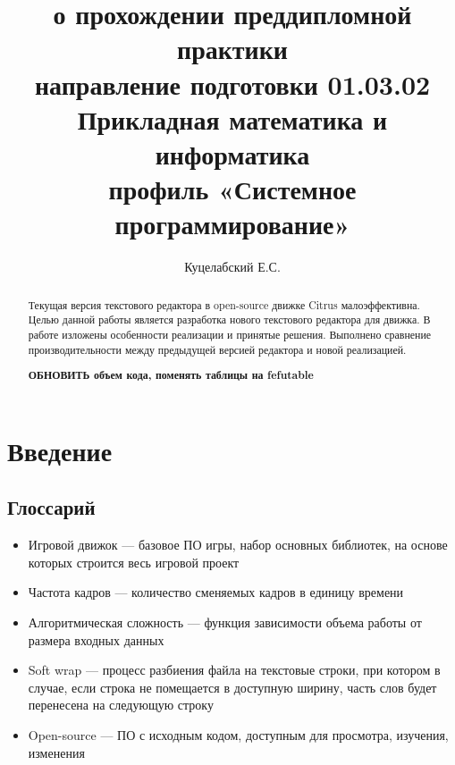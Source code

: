 \documentclass{fefu}
\begin{document}
	\title{о прохождении преддипломной практики\\направление подготовки 01.03.02 
	Прикладная математика и информатика\\профиль «Системное программирование»}
	\author{Куцелабский Е.С.}
	
	\makereporttitle
	\tableofcontents
	\newpage
	
	\begin{abstract}
		\par Текущая версия текстового редактора в open-source движке Citrus малоэффективна.
		Целью данной работы является разработка нового текстового редактора для 
		движка. В работе изложены особенности реализации и принятые решения.
		Выполнено сравнение производительности между предыдущей версией редактора и
		новой реализацией.
		\par \textbf{ОБНОВИТЬ объем кода, поменять таблицы на fefutable}
	\end{abstract}

	\section{Введение}
		\subsection{Глоссарий}
			\begin{itemize}
				\item Игровой движок --- базовое ПО игры, набор основных библиотек, на основе
				которых строится весь игровой проект
				\item Частота кадров --- количество сменяемых кадров в единицу времени
				\item Алгоритмическая сложность --- функция зависимости объема работы от 
				размера входных данных
				\item Soft wrap --- процесс разбиения файла на текстовые строки, при котором
				в случае, если строка не помещается в доступную ширину, часть слов будет
				перенесена на следующую строку
				\item Open-source --- ПО с исходным кодом, доступным для просмотра, изучения, 
				изменения
			\end{itemize}
\end{document}
